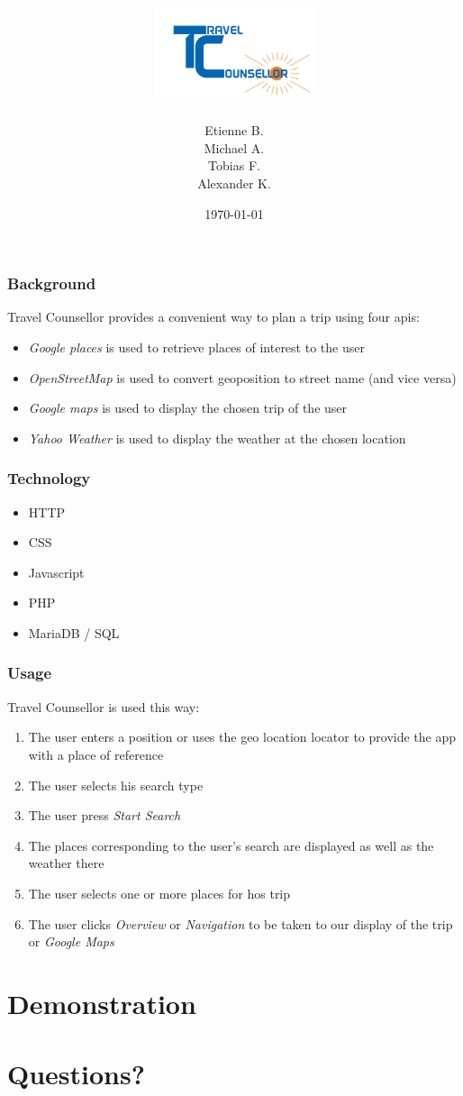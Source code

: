 \documentclass{beamer}
\title{\hspace{60px}\includegraphics[height=100px]{resources/logo.png}}
\institute{University of Innsbruck}
\date{\today}
\institute{Innsbruck University}
\author[Etienne Bertin]{Etienne B. \\ Michael A.\\ Tobias F.\\ Alexander K.}
\begin{document}
\begin{frame}
	\titlepage
\end{frame}


\begin{frame}
	\frametitle{Background}
	Travel Counsellor provides a convenient way to plan a trip using four apis:
	\begin{itemize}
		\item \textit{Google places} is used to retrieve places of interest to the user
		\item \textit{OpenStreetMap} is used to convert geoposition to street name (and vice versa)
		\item \textit{Google maps} is used to display the chosen trip of the user
		\item \textit{Yahoo Weather} is used to display the weather at the chosen location
	\end{itemize}
\end{frame}


\begin{frame}
	\frametitle{Technology}
	\begin{itemize}
		\item HTTP
		\item CSS
		\item Javascript
		\item PHP
		\item MariaDB / SQL
	\end{itemize}
\end{frame}


\begin{frame}
	\frametitle{Usage}
	Travel Counsellor is used this way:
	\begin{enumerate}
		\item The user enters a position or uses the geo location locator to provide the app with a place of reference
		\item The user selects his search type
		\item The user press \textit{Start Search}
		\item The places corresponding to the user's search are displayed as well as the weather there
		\item The user selects one or more places for hos trip
		\item The user clicks \textit{Overview} or \textit{Navigation} to be taken to our display of the trip or \textit{Google Maps}
	\end{enumerate}
\end{frame}


\section{Demonstration}
\section{Questions?}
\end{document}
